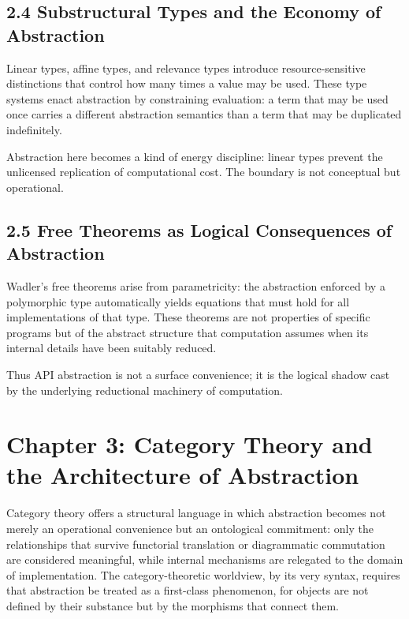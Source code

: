 \documentclass[11pt,letterpaper]{article}
\begin{document}
\subsection{2.4 Substructural Types and the Economy of Abstraction}

Linear types, affine types, and relevance types introduce resource-sensitive distinctions that control how many times a value may be used. These type systems enact abstraction by constraining evaluation: a term that may be used once carries a different abstraction semantics than a term that may be duplicated indefinitely.

Abstraction here becomes a kind of energy discipline: linear types prevent the unlicensed replication of computational cost. The boundary is not conceptual but operational.

\subsection{2.5 Free Theorems as Logical Consequences of Abstraction}

Wadler’s free theorems arise from parametricity: the abstraction enforced by a polymorphic type automatically yields equations that must hold for all implementations of that type. These theorems are not properties of specific programs but of the abstract structure that computation assumes when its internal details have been suitably reduced.

Thus API abstraction is not a surface convenience; it is the logical shadow cast by the underlying reductional machinery of computation.

\newpage

\section{Chapter 3: Category Theory and the Architecture of Abstraction}

Category theory offers a structural language in which abstraction becomes not merely an operational convenience but an ontological commitment: only the relationships that survive functorial translation or diagrammatic commutation are considered meaningful, while internal mechanisms are relegated to the domain of implementation. The category-theoretic worldview, by its very syntax, requires that abstraction be treated as a first-class phenomenon, for objects are not defined by their substance but by the morphisms that connect them.
\end{document}
